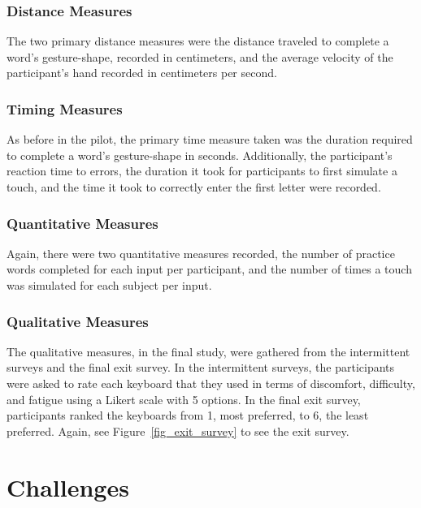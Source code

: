 \subsubsection{Distance Measures}
The two primary distance measures were the distance traveled to complete a word's gesture-shape, recorded in centimeters, and the average velocity of the participant's hand recorded in centimeters per second.

\subsubsection{Timing Measures}
As before in the pilot, the primary time measure taken was the duration required to complete a word's gesture-shape in seconds. Additionally, the participant's reaction time to errors, the duration it took for participants to first simulate a touch, and the time it took to correctly enter the first letter were recorded.

\subsubsection{Quantitative Measures}
Again, there were two quantitative measures recorded, the number of practice words completed for each input per participant, and the number of times a touch was simulated for each subject per input.

\subsubsection{Qualitative Measures}
The qualitative measures, in the final study, were gathered from the intermittent surveys and the final exit survey. In the intermittent surveys, the participants were asked to rate each keyboard that they used in terms of discomfort, difficulty, and fatigue using a Likert scale with 5 options. In the final exit survey, participants ranked the keyboards from 1, most preferred, to 6, the least preferred. Again, see Figure~\ref{fig_exit_survey} to see the exit survey.

\section{Challenges}
